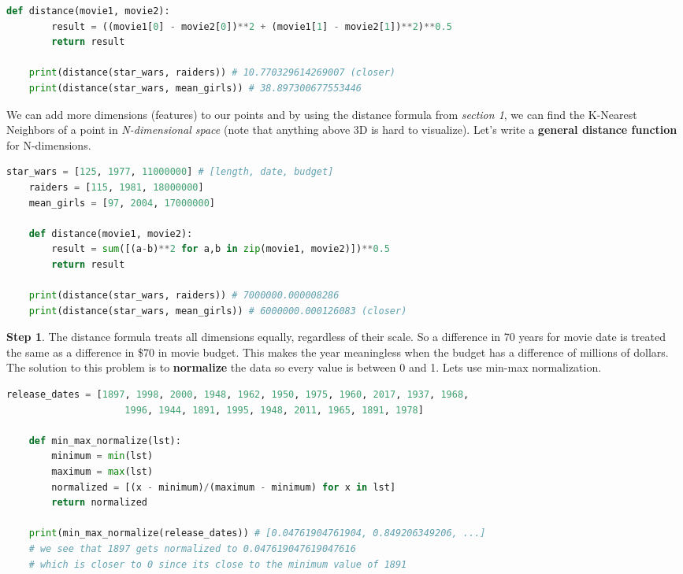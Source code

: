 \documentclass[11pt, a4paper]{article}
\begin{document}
\begin{spacing}{1.1}
\begin{lstlisting}[language=Python]
	def distance(movie1, movie2):
		result = ((movie1[0] - movie2[0])**2 + (movie1[1] - movie2[1])**2)**0.5
		return result
	
	print(distance(star_wars, raiders)) # 10.770329614269007 (closer)
	print(distance(star_wars, mean_girls)) # 38.897300677553446 \end{lstlisting}\vspace*{1mm}
	We can add more dimensions (features) to our points and by using the distance formula from \textit{section 1}, we can find the K-Nearest Neighbors of a point in \textit{N-dimensional space} (note that anything above 3D is hard to visualize). Let's write a \textbf{general distance function} for N-dimensions.
	\begin{lstlisting}[language=Python]
	star_wars = [125, 1977, 11000000] # [length, date, budget]
	raiders = [115, 1981, 18000000]
	mean_girls = [97, 2004, 17000000]
	
	def distance(movie1, movie2):
		result = sum([(a-b)**2 for a,b in zip(movie1, movie2)])**0.5
		return result
	
	print(distance(star_wars, raiders)) # 7000000.000008286
	print(distance(star_wars, mean_girls)) # 6000000.000126083 (closer) \end{lstlisting}\vspace*{1mm}
	\textbf{Step 1}. The distance formula treats all dimensions equally, regardless of their scale. So a difference in 70 years for movie date is treated the same as a difference in \$70 in movie budget. This makes the year meaningless when the budget has a difference of millions of dollars. The solution to this problem is to \textbf{normalize} the data so every value is between 0 and 1. Lets use min-max normalization.
	\begin{lstlisting}[language=Python]
	release_dates = [1897, 1998, 2000, 1948, 1962, 1950, 1975, 1960, 2017, 1937, 1968, 
	                 1996, 1944, 1891, 1995, 1948, 2011, 1965, 1891, 1978]
	
	def min_max_normalize(lst):
		minimum = min(lst)
		maximum = max(lst)
		normalized = [(x - minimum)/(maximum - minimum) for x in lst]
		return normalized
	
	print(min_max_normalize(release_dates)) # [0.04761904761904, 0.849206349206, ...]
	# we see that 1897 gets normalized to 0.047619047619047616
	# which is closer to 0 since its close to the minimum value of 1891 \end{lstlisting} \newpage


\end{spacing}
\end{document}
